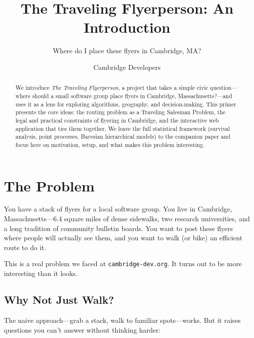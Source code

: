 \documentclass[sigconf,nonacm]{acmart}
\begin{document}
\title{The Traveling Flyerperson: An Introduction}
\subtitle{Where do I place these flyers in Cambridge, MA?}

\author{Cambridge Developers}

\renewcommand{\shortauthors}{Cambridge Developers}

\begin{abstract}
We introduce \emph{The Traveling Flyerperson}, a project that takes a simple civic question---where should a small software group place flyers in Cambridge, Massachusetts?---and uses it as a lens for exploring algorithms, geography, and decision-making. This primer presents the core ideas: the routing problem as a Traveling Salesman Problem, the legal and practical constraints of flyering in Cambridge, and the interactive web application that ties them together. We leave the full statistical framework (survival analysis, point processes, Bayesian hierarchical models) to the companion paper and focus here on motivation, setup, and what makes this problem interesting.
\end{abstract}


\maketitle

\section{The Problem}

You have a stack of flyers for a local software group. You live in Cambridge, Massachusetts---6.4 square miles of dense sidewalks, two research universities, and a long tradition of community bulletin boards. You want to post these flyers where people will actually see them, and you want to walk (or bike) an efficient route to do it.

This is a real problem we faced at \texttt{cambridge-dev.org}. It turns out to be more interesting than it looks.

\subsection{Why Not Just Walk?}

The naive approach---grab a stack, walk to familiar spots---works. But it raises questions you can't answer without thinking harder:
\end{document}
